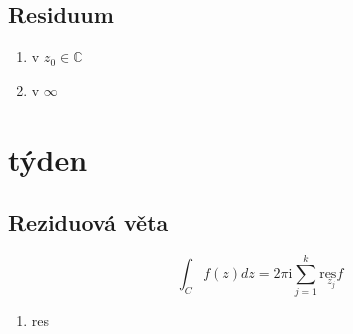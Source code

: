 \documentclass{article}
\newcommand{\mi}{\mathrm{i}}
\newcommand{\res}{\mathrm{res}}
\begin{document}
        \subsection{Residuum}

        \begin{enumerate}[label=\Alph*]
            \item v $ z_0\in\mathbb{C}$
            \item v $ \infty$
        \end{enumerate}

    \section{týden}%
    \subsection{Reziduová věta}
        \[\int_Cf(z)dz=2\pi\mi\sum_{j=1}^{k}\underset{z_j}{\res f}\]
        \begin{enumerate}
            \item res
        \end{enumerate}
\end{document}

